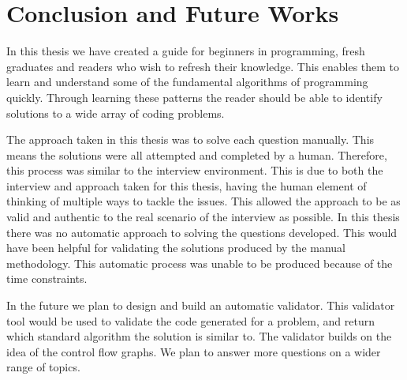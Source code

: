 \documentclass[10pt,twocolumn,hidelinks]{IEEEtran}
\begin{document}
\section{Conclusion and Future Works}
In this thesis we have created a guide for beginners in programming, fresh graduates and readers who wish to refresh their knowledge. This enables them to learn and understand some of the fundamental algorithms of programming quickly. Through learning these patterns the reader should be able to identify solutions to a wide array of coding problems. 
\par The approach taken in this thesis was to solve each question manually. This means the solutions were all attempted and completed by a human. Therefore, this process was similar to the interview environment. This is due to both the interview and approach taken for this thesis, having the human element of thinking of multiple ways to tackle the issues. This allowed the approach to be as valid and authentic to the real scenario of the interview as possible.
 In this thesis there was no automatic approach to solving the questions developed. This would have been helpful for validating the solutions produced by the manual methodology. This automatic process was unable to be produced because of the time constraints. 
 \par In the future we plan to design and build an automatic validator. This validator tool would be used to validate the code generated for a problem, and return which standard algorithm the solution is similar to. The validator builds on the idea of the control flow graphs.
 We plan to answer more questions on a wider range of topics.
\nocite{goodrich2014data,carrano2003data,MossBowyer,VKuncak,Karp:1987}


\end{document}
